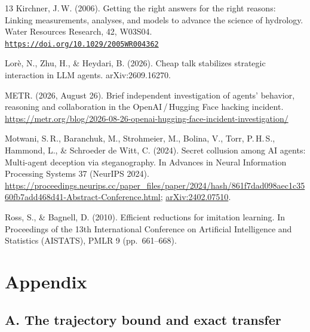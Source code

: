 \documentclass[11pt,letterpaper]{article}
\newcommand{\doi}[1]{\href{https://doi.org/#1}{\nolinkurl{https://doi.org/#1}}}
\begin{document}
\begin{thebibliography}{13}
Kirchner, J.\,W. (2006).
Getting the right answers for the right reasons: Linking measurements, analyses, and models to advance the science of hydrology.
Water Resources Research, 42, W03S04.
\doi{10.1029/2005WR004362}

Lor{\`e}, N., Zhu, H., \& Heydari, B. (2026).
Cheap talk stabilizes strategic interaction in LLM agents.
arXiv:2609.16270.

METR. (2026, August 26).
Brief independent investigation of agents' behavior, reasoning and collaboration in the OpenAI\,/\,Hugging Face hacking incident.
\url{https://metr.org/blog/2026-08-26-openai-hugging-face-incident-investigation/}

Motwani, S.\,R., Baranchuk, M., Strohmeier, M., Bolina, V., Torr, P.\,H.\,S., Hammond, L., \& Schroeder de Witt, C. (2024).
Secret collusion among AI agents: Multi-agent deception via steganography.
In Advances in Neural Information Processing Systems 37 (NeurIPS 2024).
\url{https://proceedings.neurips.cc/paper_files/paper/2024/hash/861f7dad098aec1c3560fb7add468d41-Abstract-Conference.html}; \href{https://arxiv.org/abs/2402.07510}{arXiv:2402.07510}.

Ross, S., \& Bagnell, D. (2010).
Efficient reductions for imitation learning.
In Proceedings of the 13th International Conference on Artificial Intelligence and Statistics (AISTATS), PMLR 9 (pp.~661--668).

\end{thebibliography}

\section{Appendix}
\setcounter{figure}{0}
\renewcommand{\thefigure}{A\arabic{figure}}

\subsection{A. The trajectory bound and exact transfer}
\end{document}
